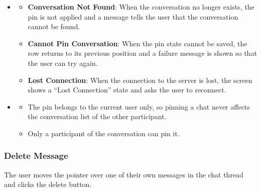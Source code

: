 \begin{itemize}[leftmargin=1.6em,topsep=4pt,itemsep=3pt,parsep=0pt,label=$\bullet$]
        \begin{itemize}[leftmargin=2.2em,topsep=2pt,itemsep=3pt,parsep=0pt,label=$\circ$]
            \item The pinned conversation stays at the top of the conversation list of the current user.
            \item The content of the conversation and the messages are not changed by this action.
        \end{itemize}
    \item {}

        \begin{itemize}[leftmargin=2.2em,topsep=2pt,itemsep=3pt,parsep=0pt,label=$\circ$]
            \item \textbf{Conversation Not Found}: When the conversation no longer exists, the pin is not applied and a message tells the user that the conversation cannot be found.
            \item \textbf{Cannot Pin Conversation}: When the pin state cannot be saved, the row returns to its previous position and a failure message is shown so that the user can try again.
            \item \textbf{Lost Connection}: When the connection to the server is lost, the screen shows a ``Lost Connection'' state and asks the user to reconnect.
        \end{itemize}
    \item {}

        \begin{itemize}[leftmargin=2.2em,topsep=2pt,itemsep=3pt,parsep=0pt,label=$\circ$]
            \item The pin belongs to the current user only, so pinning a chat never affects the conversation list of the other participant.
            \item Only a participant of the conversation can pin it.
        \end{itemize}
\end{itemize}


\subsubsection{Delete Message}

 The user moves the pointer over one of their own messages in the chat thread and clicks the delete button.

